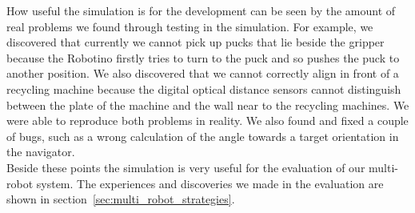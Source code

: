 How useful the simulation is for the development can be seen by the amount of real problems we found through testing in the simulation. For example, we discovered that currently we cannot pick up pucks that lie beside the gripper because the Robotino firstly tries to turn to the puck and so pushes the puck to another position. We also discovered that we cannot correctly align in front of a recycling machine because the digital optical distance sensors cannot distinguish between the plate of the machine and the wall near to the recycling machines. We were able to reproduce both problems in reality. We also found and fixed a couple of bugs, such as a wrong calculation of the angle towards a target orientation in the navigator.\\
Beside these points the simulation is very useful for the evaluation of our multi-robot system. The experiences and discoveries we made in the evaluation are shown in section~\ref{sec:multi_robot_strategies}.\\


